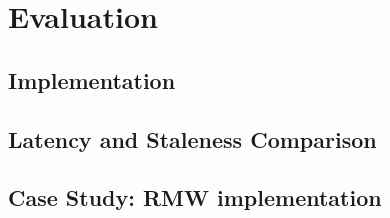 \section{Evaluation}
\subsection{Implementation}
\subsection{Latency and Staleness Comparison}
\subsection{Case Study: RMW implementation}


